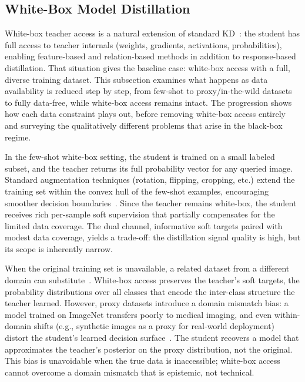 \documentclass[12pt, a4paper, twoside]{book}
\numberwithin{equation}{chapter}
\theoremstyle{plain}
\theoremstyle{definition}
\theoremstyle{remark}
\newenvironment{foldable}{}{}
\newcommand*{\eg}{e.g.}
\newcommand*{\etc}{etc.}
\begin{document}
\subsection{White-Box Model Distillation} \label{sec:24-background-kdrestricted-whitebox}
\begin{foldable}
  White-box teacher access is a natural extension of standard \ac{KD}~\cite{hinton2015distilling}: the student has full access to teacher internals (weights, gradients, activations, probabilities), enabling feature-based and relation-based methods in addition to response-based distillation.
  That situation gives the baseline case: white-box access with a full, diverse training dataset.
  This subsection examines what happens as data availability is reduced step by step, from few-shot to proxy/in-the-wild datasets to fully data-free, while white-box access remains intact.
  The progression shows how each data constraint plays out, before removing white-box access entirely and surveying the qualitatively different problems that arise in the black-box regime.
\end{foldable}

\begin{foldable}
  In the few-shot white-box setting, the student is trained on a small labeled subset, and the teacher returns its full probability vector for any queried image.
  Standard augmentation techniques (rotation, flipping, cropping, \etc) extend the training set within the convex hull of the few-shot examples, encouraging smoother decision boundaries~\cite{shorten2019survey}.
  Since the teacher remains white-box, the student receives rich per-sample soft supervision that partially compensates for the limited data coverage.
  The dual channel, informative soft targets paired with modest data coverage, yields a trade-off: the distillation signal quality is high, but its scope is inherently narrow.
\end{foldable}

\begin{foldable}
  When the original training set is unavailable, a related dataset from a different domain can substitute~\cite{chen2021learning, tang2023distribution}.
  White-box access preserves the teacher's soft targets, the probability distributions over all classes that encode the inter-class structure the teacher learned.
  However, proxy datasets introduce a domain mismatch bias: a model trained on ImageNet transfers poorly to medical imaging, and even within-domain shifts (\eg, synthetic images as a proxy for real-world deployment) distort the student's learned decision surface~\cite{torralba2011unbiased}.
  The student recovers a model that approximates the teacher's posterior on the proxy distribution, not the original.
  This bias is unavoidable when the true data is inaccessible; white-box access cannot overcome a domain mismatch that is epistemic, not technical.
\end{foldable}
\end{document}
